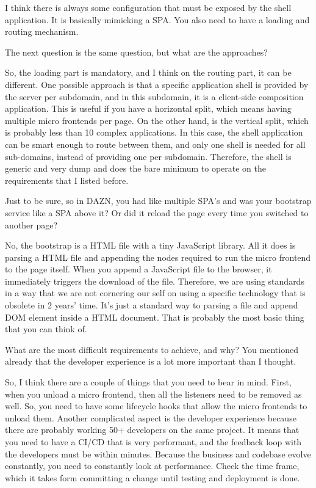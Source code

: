 \begin{description}
    \LucaMezzalira I think there is always some configuration that must be exposed by the shell application. It is basically mimicking a SPA. You also need to have a loading and routing mechanism.

    \NicoVogel The next question is the same question, but what are the approaches?

    \LucaMezzalira So, the loading part is mandatory, and I think on the routing part, it can be different. One possible approach is that a specific application shell is provided by the server per subdomain, and in this subdomain, it is a client-side composition application. This is useful if you have a horizontal split, which means having multiple micro frontends per page. On the other hand, is the vertical split, which is probably less than 10 complex applications. In this case, the shell application can be smart enough to route between them, and only one shell is needed for all sub-domains, instead of providing one per subdomain. Therefore, the shell is generic and very dump and does the bare minimum to operate on the requirements that I listed before.

    \NicoVogel Just to be sure, so in DAZN, you had like multiple SPA’s and was your bootstrap service like a SPA above it? Or did it reload the page every time you switched to another page?

    \LucaMezzalira No, the bootstrap is a HTML file with a tiny JavaScript library. All it does is parsing a HTML file and appending the nodes required to run the micro frontend to the page itself. When you append a JavaScript file to the browser, it immediately triggers the download of the file. Therefore, we are using standards in a way that we are not cornering our self on using a specific technology that is obsolete in 2 years’ time. It’s just a standard way to parsing a file and append DOM element inside a HTML document. That is probably the most basic thing that you can think of.

    \NicoVogel What are the most difficult requirements to achieve, and why? You mentioned already that the developer experience is a lot more important than I thought.

    \LucaMezzalira So, I think there are a couple of things that you need to bear in mind. First, when you unload a micro frontend, then all the listeners need to be removed as well. So, you need to have some lifecycle hooks that allow the micro frontends to unload them. Another complicated aspect is the developer experience because there are probably working 50+ developers on the same project. It means that you need to have a CI/CD that is very performant, and the feedback loop with the developers must be within minutes. Because the business and codebase evolve constantly, you need to constantly look at performance. Check the time frame, which it takes form committing a change until testing and deployment is done.


\end{description}
